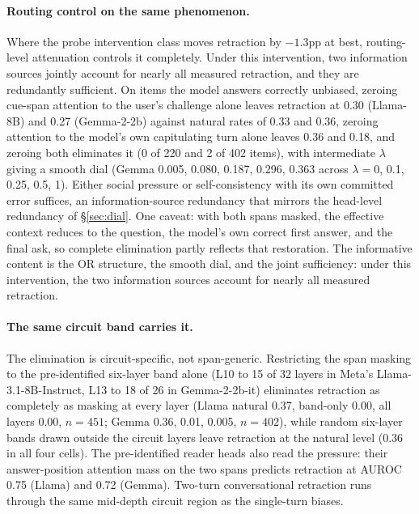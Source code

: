 \documentclass{article}
\begin{document}
\paragraph{Routing control on the same phenomenon.} Where the probe intervention class moves retraction by $-1.3$pp at best, routing-level attenuation controls it completely. Under this intervention, two information sources jointly account for nearly all measured retraction, and they are redundantly sufficient. On items the model answers correctly unbiased, zeroing cue-span attention to the user's challenge alone leaves retraction at 0.30 (Llama-8B) and 0.27 (Gemma-2-2b) against natural rates of 0.33 and 0.36, zeroing attention to the model's own capitulating turn alone leaves 0.36 and 0.18, and zeroing both eliminates it (0 of 220 and 2 of 402 items), with intermediate $\lambda$ giving a smooth dial (Gemma 0.005, 0.080, 0.187, 0.296, 0.363 across $\lambda = 0$, 0.1, 0.25, 0.5, 1). Either social pressure or self-consistency with its own committed error suffices, an information-source redundancy that mirrors the head-level redundancy of \S\ref{sec:dial}. One caveat: with both spans masked, the effective context reduces to the question, the model's own correct first answer, and the final ask, so complete elimination partly reflects that restoration. The informative content is the OR structure, the smooth dial, and the joint sufficiency: under this intervention, the two information sources account for nearly all measured retraction.

\paragraph{The same circuit band carries it.} The elimination is circuit-specific, not span-generic. Restricting the span masking to the pre-identified six-layer band alone (L10 to 15 of 32 layers in Meta's Llama-3.1-8B-Instruct, L13 to 18 of 26 in Gemma-2-2b-it) eliminates retraction as completely as masking at every layer (Llama natural 0.37, band-only 0.00, all layers 0.00, $n=451$; Gemma 0.36, 0.01, 0.005, $n=402$), while random six-layer bands drawn outside the circuit layers leave retraction at the natural level (0.36 in all four cells). The pre-identified reader heads also read the pressure: their answer-position attention mass on the two spans predicts retraction at AUROC 0.75 (Llama) and 0.72 (Gemma). Two-turn conversational retraction runs through the same mid-depth circuit region as the single-turn biases.
\end{document}
